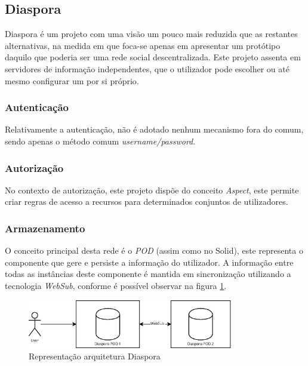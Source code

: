\subsection{Diaspora}
Diaspora é um projeto com uma visão um pouco mais reduzida que as restantes alternativas, na medida em que foca-se apenas em apresentar um protótipo daquilo que poderia ser uma rede social descentralizada. Este projeto assenta em servidores de informação independentes, que o utilizador pode escolher ou até mesmo configurar um por si próprio\cite{diaspora_wiki}.

\subsubsection{Autenticação}
Relativamente a autenticação, não é adotado nenhum mecanismo fora do comum, sendo apenas o método comum \emph{username/password}.

\subsubsection{Autorização}
No contexto de autorização, este projeto dispõe do conceito \emph{Aspect}, este permite criar regras de acesso a recursos para determinados conjuntos de utilizadores\cite{diaspora_wiki}.

\subsubsection{Armazenamento}
O conceito principal desta rede é o \emph{POD} (assim como no Solid), este representa o componente que gere e persiste a informação do utilizador. A informação entre todas as instâncias deste componente é mantida em sincronização utilizando a tecnologia \emph{WebSub}, conforme é possível observar na figura \ref{estado_arte_representacao_diaspora}\cite{diaspora_wiki}.

\begin{figure}[H]
    \includegraphics[width=0.8\textwidth]{figures/estado_arte-Diaspora.eps}
    \caption{Representação arquitetura Diaspora}
    \label{estado_arte_representacao_diaspora}
\end{figure}

